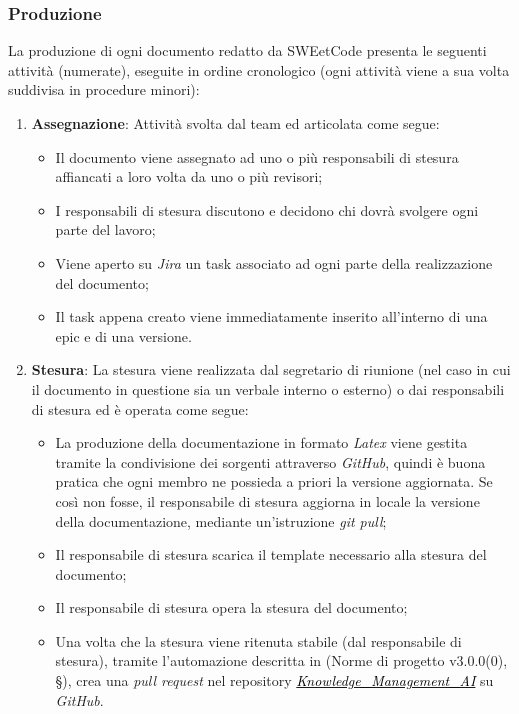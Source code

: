 \documentclass[10pt, a4paper]{article}
\begin{document}
\subsubsection{Produzione}
\label{sec:ciclo_vita}
La produzione di ogni documento redatto da SWEetCode presenta le seguenti attività (numerate), eseguite in ordine cronologico (ogni attività viene a sua volta suddivisa in procedure minori):
\begin{enumerate}
    \item \textbf{Assegnazione}: Attività svolta dal team ed articolata come segue:
    \begin{itemize}
        \item Il documento viene assegnato ad uno o più responsabili di stesura affiancati a loro volta da uno o più revisori;
        \item I responsabili di stesura discutono e decidono chi dovrà svolgere ogni parte del lavoro;
        \item Viene aperto su \textit{Jira} un task associato ad ogni parte della realizzazione del documento;
        \item Il task appena creato viene immediatamente inserito all'interno di una epic e di una versione.
    \end{itemize}
    \item \textbf{Stesura}: La stesura viene realizzata dal segretario di riunione (nel caso in cui il documento in questione sia un verbale 
    interno o esterno) o dai responsabili di stesura ed è operata come segue:
    \begin{itemize}
        \item La produzione della documentazione in formato \textit{Latex} viene gestita tramite la condivisione dei sorgenti attraverso \textit{GitHub}, quindi è buona pratica che ogni membro ne possieda a priori la versione aggiornata. Se così non fosse, il responsabile di stesura aggiorna in locale la versione della documentazione, mediante un'istruzione \textit{git pull};
        \item Il responsabile di stesura scarica il template necessario alla stesura del documento;
        \item Il responsabile di stesura opera la stesura del documento;
        \item Una volta che la stesura viene ritenuta stabile (dal responsabile di stesura), tramite l'automazione descritta in (Norme di progetto v3.0.0(0), \S {}), crea una \textit{pull request} nel repository \href{https://github.com/sweetcode-team/Knowledge_Management_AI}{\textcolor{black}{\textit{Knowledge\_Management\_AI}}} su \textit{GitHub}.
    \end{itemize}


\end{enumerate}
\end{document}
